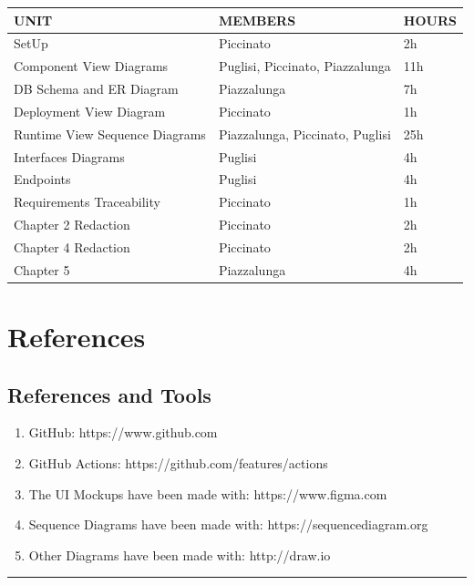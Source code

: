 \documentclass{Configuration_Files/Template}
\begin{document}
\begin{table}[h]
\centering
\begin{tabularx}{\textwidth}{| X | X | X |}
\hline
\textbf{UNIT} & \textbf{MEMBERS} & \textbf{HOURS} \\ [1ex]
\hline
SetUp & Piccinato & 2h \\ [1ex]
\hline
Component View Diagrams & Puglisi, Piccinato, Piazzalunga & 11h \\ [1ex]
\hline
DB Schema and ER Diagram & Piazzalunga & 7h \\ [1ex]
\hline
Deployment View Diagram & Piccinato & 1h \\ [1ex]
\hline
Runtime View Sequence Diagrams & Piazzalunga, Piccinato, Puglisi & 25h \\ [1ex]
\hline
Interfaces Diagrams & Puglisi & 4h \\ [1ex]
\hline
Endpoints & Puglisi & 4h \\ [1ex]
\hline
Requirements Traceability & Piccinato & 1h \\ [1ex]
\hline
Chapter 2 Redaction & Piccinato & 2h \\ [1ex]
\hline
Chapter 4 Redaction & Piccinato & 2h \\ [1ex]
\hline
Chapter 5 & Piazzalunga & 4h \\ [1ex]

\hline
\end{tabularx}
\end{table}

\chapter{References}

\section{References and Tools}

\begin{enumerate}
    \item GitHub: https://www.github.com
    \item GitHub Actions: https://github.com/features/actions
    \item The UI Mockups have been made with: https://www.figma.com
    \item Sequence Diagrams have been made with: https://sequencediagram.org
    \item Other Diagrams have been made with: http://draw.io
\end{enumerate}

{\color{bluepoli}\rule{\linewidth}{0.1pt}}
\end{document}
